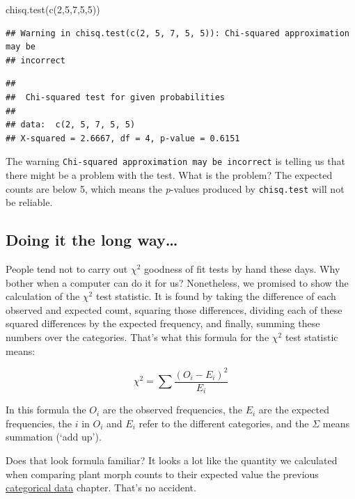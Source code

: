 \documentclass[
]{book}
\newenvironment{Shaded}{\begin{snugshade}}{\end{snugshade}}
\newcommand{\DecValTok}[1]{\textcolor[rgb]{0.00,0.00,0.81}{#1}}
\newcommand{\FunctionTok}[1]{\textcolor[rgb]{0.00,0.00,0.00}{#1}}
\newcommand{\NormalTok}[1]{#1}
\begin{document}
\begin{Shaded}
\begin{Highlighting}[]
\FunctionTok{chisq.test}\NormalTok{(}\FunctionTok{c}\NormalTok{(}\DecValTok{2}\NormalTok{,}\DecValTok{5}\NormalTok{,}\DecValTok{7}\NormalTok{,}\DecValTok{5}\NormalTok{,}\DecValTok{5}\NormalTok{))}
\end{Highlighting}
\end{Shaded}

\begin{verbatim}
## Warning in chisq.test(c(2, 5, 7, 5, 5)): Chi-squared approximation may be
## incorrect
\end{verbatim}

\begin{verbatim}
## 
##  Chi-squared test for given probabilities
## 
## data:  c(2, 5, 7, 5, 5)
## X-squared = 2.6667, df = 4, p-value = 0.6151
\end{verbatim}

The warning \texttt{Chi-squared\ approximation\ may\ be\ incorrect} is telling us that there might be a problem with the test. What is the problem? The expected counts are below 5, which means the \emph{p}-values produced by \texttt{chisq.test} will not be reliable.

\hypertarget{doing-it-the-long-way}{%
\subsection{Doing it the long way\ldots{}}\label{doing-it-the-long-way}}

People tend not to carry out \(\chi^{2}\) goodness of fit tests by hand these days. Why bother when a computer can do it for us? Nonetheless, we promised to show the calculation of the \(\chi^{2}\) test statistic. It is found by taking the difference of each observed and expected count, squaring those differences, dividing each of these squared differences by the expected frequency, and finally, summing these numbers over the categories. That's what this formula for the \(\chi^{2}\) test statistic means:

\[\chi^{2}=\sum\frac{(O_i-E_i)^{2}}{E_i}\]

In this formula the \(O_i\) are the observed frequencies, the \(E_i\) are the expected frequencies, the \(i\) in \(O_i\) and \(E_i\) refer to the different categories, and the \(\Sigma\) means summation (`add up').

Does that look formula familiar? It looks a lot like the quantity we calculated when comparing plant morph counts to their expected value the previous \protect\hyperlink{categorical-data-intro-chapter}{categorical data} chapter. That's no accident.
\end{document}

